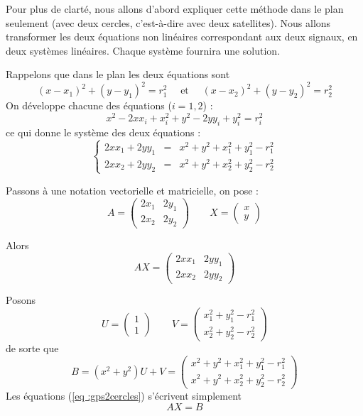 \documentclass[class=report,crop=false]{standalone}
\begin{document}
Pour plus de clarté, nous allons d'abord expliquer cette méthode dans le plan seulement
(avec deux cercles, c'est-à-dire avec deux satellites). 
Nous allons transformer les deux équations non linéaires correspondant aux deux signaux,
en deux systèmes linéaires. Chaque système fournira une solution.

Rappelons que dans le plan les deux équations sont
$$(x-x_1)^2 + (y-y_1)^2 = r_1^2 
\quad\text{ et }\quad
(x-x_2)^2 + (y-y_2)^2 = r_2^2$$
On développe chacune des équations ($i=1,2$) :
$$x^2 -2xx_i + x_i^2 + y^2-2yy_i + y_i^2 = r_i^2$$
ce qui donne le système des deux équations :
\begin{equation}
\label{eq :gps2cercles}
\left\{\begin{array}{rcl}
2xx_1 + 2yy_1 &=& x^2+y^2 + x_1^2 + y_1^2 - r_1^2 \\
2xx_2 + 2yy_2 &=& x^2+y^2 + x_2^2 + y_2^2 - r_2^2 
\end{array}
\right.  
\end{equation}

Passons à une notation vectorielle et matricielle, on pose :
$$
A = \begin{pmatrix}2x_1&2y_1\\2x_2&2y_2\end{pmatrix}\qquad
X = \begin{pmatrix}x\\y\end{pmatrix}$$

Alors 
$$A X = \begin{pmatrix}2xx_1&2yy_1\\2xx_2&2yy_2\end{pmatrix}$$

Posons 
$$U = \begin{pmatrix}1\\1\end{pmatrix} \qquad
V = \begin{pmatrix}x_1^2 + y_1^2 - r_1^2\\x_2^2 + y_2^2 - r_2^2\end{pmatrix}$$
de sorte que 
$$B = (x^2+y^2) U + V = 
\begin{pmatrix}x^2+y^2 + x_1^2 + y_1^2 - r_1^2\\
x^2+y^2 + x_2^2 + y_2^2 - r_2^2\end{pmatrix}$$
Les équations (\ref{eq :gps2cercles}) s'écrivent simplement
\begin{equation}
\label{eq :gps2cerclesmat}
AX=B
\end{equation}
\end{document}
